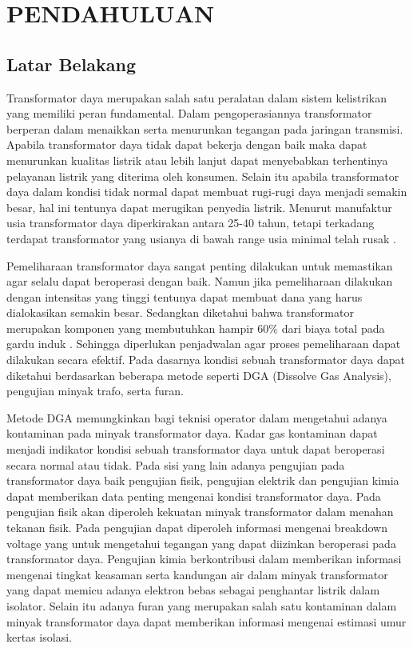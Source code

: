 \chapter{PENDAHULUAN}
\label{BAB1:pendahuluan}

\section{Latar Belakang}
Transformator daya merupakan salah satu peralatan dalam sistem kelistrikan yang memiliki peran fundamental. Dalam pengoperasiannya transformator berperan dalam menaikkan serta menurunkan tegangan pada jaringan transmisi. Apabila transformator daya tidak dapat bekerja dengan baik maka dapat menurunkan kualitas listrik atau lebih lanjut dapat menyebabkan terhentinya pelayanan listrik yang diterima oleh konsumen. Selain itu apabila transformator daya dalam kondisi tidak normal dapat membuat rugi-rugi daya menjadi semakin besar, hal ini tentunya dapat merugikan penyedia listrik. Menurut manufaktur usia transformator daya diperkirakan antara 25-40 tahun, tetapi terkadang terdapat transformator yang usianya di bawah range usia minimal telah rusak \cite{jahromi2009approach}.\par
Pemeliharaan transformator daya sangat penting dilakukan untuk memastikan agar selalu dapat beroperasi dengan baik. Namun jika pemeliharaan dilakukan dengan intensitas yang tinggi tentunya dapat membuat dana yang harus dialokasikan semakin besar. Sedangkan diketahui bahwa transformator merupakan komponen yang membutuhkan hampir 60\% dari biaya total pada gardu induk \cite{jahromi2009approach}. Sehingga diperlukan penjadwalan agar proses pemeliharaan dapat dilakukan secara efektif. Pada dasarnya kondisi sebuah transformator daya dapat diketahui berdasarkan beberapa metode seperti DGA (Dissolve Gas Analysis), pengujian minyak trafo, serta furan.\par
Metode DGA memungkinkan bagi teknisi operator dalam mengetahui adanya kontaminan pada minyak transformator daya. Kadar gas kontaminan dapat menjadi indikator kondisi sebuah transformator daya untuk dapat beroperasi secara normal atau tidak. Pada sisi yang lain adanya pengujian pada transformator daya baik pengujian fisik, pengujian elektrik dan pengujian kimia dapat memberikan data penting mengenai kondisi transformator daya. Pada pengujian fisik akan diperoleh kekuatan minyak transformator dalam menahan tekanan fisik. Pada pengujian dapat diperoleh informasi mengenai breakdown voltage yang untuk mengetahui tegangan yang dapat diizinkan beroperasi pada transformator daya. Pengujian kimia berkontribusi dalam memberikan informasi mengenai tingkat keasaman serta kandungan air dalam minyak transformator yang dapat memicu adanya elektron bebas sebagai penghantar listrik dalam isolator. Selain itu adanya furan yang merupakan salah satu kontaminan dalam minyak transformator daya dapat memberikan informasi mengenai estimasi umur kertas isolasi.\par
